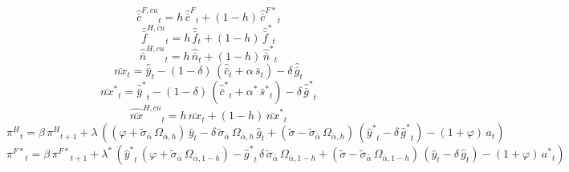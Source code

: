\begin{dmath}
{{\hat {\bar c}^{F,cu}}}_{t}={{h}}\, {{\hat {\bar c}^F}}_{t}+\left(1-{{h}}\right)\, {{\hat {\bar c}^{F*}}}_{t}
\end{dmath}
\begin{dmath}
{{\hat {\bar f}^{H,cu}}}_{t}={{h}}\, {{\hat {\bar f}}}_{t}+\left(1-{{h}}\right)\, {{\hat {\bar f}^*}}_{t}
\end{dmath}
\begin{dmath}
{{\hat {\bar n}^{H,cu}}}_{t}={{h}}\, {{\hat {\bar n}}}_{t}+\left(1-{{h}}\right)\, {{\hat {\bar n}^*}}_{t}
\end{dmath}
\begin{dmath}
{{\bar{nx}}}_{t}={{\hat {\bar y}}}_{t}-\left(1-{{\delta}}\right)\, \left({{\hat {\bar c}}}_{t}+{{\alpha}}\, {{\bar s}}_{t}\right)-{{\delta}}\, {{\hat {\bar g}}}_{t}
\end{dmath}
\begin{dmath}
{{\bar{nx}^*}}_{t}={{\hat {\bar y}^*}}_{t}-\left(1-{{\delta}}\right)\, \left({{\hat {\bar c}^*}}_{t}+{{\alpha^*}}\, {{\bar s^*}}_{t}\right)-{{\delta}}\, {{\hat {\bar g}^*}}_{t}
\end{dmath}
\begin{dmath}
{{\hat {\bar{nx}}^{H,cu}}}_{t}={{h}}\, {{\bar{nx}}}_{t}+\left(1-{{h}}\right)\, {{\bar{nx}^*}}_{t}
\end{dmath}
\begin{dmath}
{{\pi^H}}_{t}={{\beta}}\, {{\pi^H}}_{t+1}+{{\lambda}}\, \left(\left({{\varphi}}+{{\tilde\sigma_{\bar{\alpha}}}}\, {{\Omega_{\bar \alpha,h}}}\right)\, {{\hat y}}_{t}-{{\delta}}\, {{\tilde\sigma_{\bar{\alpha}}}}\, {{\Omega_{\bar \alpha,h}}}\, {{\hat g}}_{t}+\left({{\tilde{\sigma}}}-{{\tilde\sigma_{\bar{\alpha}}}}\, {{\Omega_{\bar \alpha,h}}}\right)\, \left({{\hat y^*}}_{t}-{{\delta}}\, {{\hat g^*}}_{t}\right)-\left(1+{{\varphi}}\right)\, {{a}}_{t}\right)
\end{dmath}
\begin{dmath}
{{\pi^{F*}}}_{t}={{\beta}}\, {{\pi^{F*}}}_{t+1}+{{\lambda^*}}\, \left({{\hat y^*}}_{t}\, \left({{\varphi}}+{{\tilde\sigma_{\bar{\alpha}}}}\, {{\Omega_{\bar \alpha,1-h}}}\right)-{{\hat g^*}}_{t}\, {{\delta}}\, {{\tilde\sigma_{\bar{\alpha}}}}\, {{\Omega_{\bar \alpha,1-h}}}+\left({{\tilde{\sigma}}}-{{\tilde\sigma_{\bar{\alpha}}}}\, {{\Omega_{\bar \alpha,1-h}}}\right)\, \left({{\hat y}}_{t}-{{\delta}}\, {{\hat g}}_{t}\right)-\left(1+{{\varphi}}\right)\, {{a^*}}_{t}\right)
\end{dmath}
